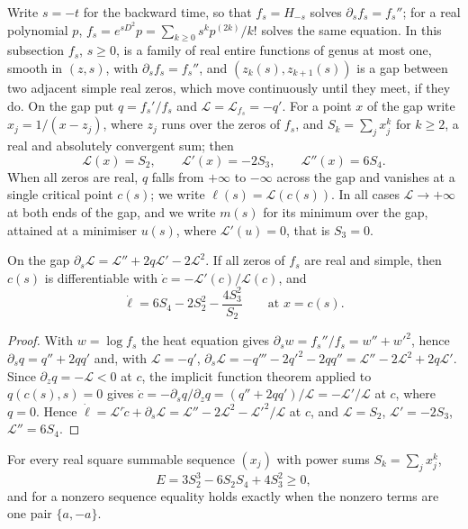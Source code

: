 Write $s=-t$ for the backward time, so that $f_s=H_{-s}$ solves $\partial_sf_s=f_s''$; for a real polynomial $p$, $f_s=e^{sD^2}p=\sum_{k\ge0}s^kp^{(2k)}/k!$ solves the same equation. In this subsection $f_s$, $s\ge0$, is a family of real entire functions of genus at most one, smooth in $(z,s)$, with $\partial_sf_s=f_s''$, and $(z_k(s),z_{k+1}(s))$ is a gap between two adjacent simple real zeros, which move continuously until they meet, if they do. On the gap put $q=f_s'/f_s$ and $\mathcal L=\mathcal L_{f_s}=-q'$. For a point $x$ of the gap write $x_j=1/(x-z_j)$, where $z_j$ runs over the zeros of $f_s$, and $S_k=\sum_jx_j^k$ for $k\ge2$, a real and absolutely convergent sum; then
\[
\mathcal L(x)=S_2,\qquad\mathcal L'(x)=-2S_3,\qquad\mathcal L''(x)=6S_4.
\]
When all zeros are real, $q$ falls from $+\infty$ to $-\infty$ across the gap and vanishes at a single critical point $c(s)$; we write $\ell(s)=\mathcal L(c(s))$. In all cases $\mathcal L\to+\infty$ at both ends of the gap, and we write $m(s)$ for its minimum over the gap, attained at a minimiser $u(s)$, where $\mathcal L'(u)=0$, that is $S_3=0$.

\begin{lemma}\label{lem:wigbiane:evol}
On the gap $\partial_s\mathcal L=\mathcal L''+2q\mathcal L'-2\mathcal L^2$. If all zeros of $f_s$ are real and simple, then $c(s)$ is differentiable with $\dot c=-\mathcal L'(c)/\mathcal L(c)$, and
\[
\dot\ell=6S_4-2S_2^2-\frac{4S_3^2}{S_2}\qquad\text{at }x=c(s).
\]
\end{lemma}

\begin{proof}
With $w=\log f_s$ the heat equation gives $\partial_sw=f_s''/f_s=w''+w'^2$, hence $\partial_sq=q''+2qq'$ and, with $\mathcal L=-q'$, $\partial_s\mathcal L=-q'''-2q'^2-2qq''=\mathcal L''-2\mathcal L^2+2q\mathcal L'$. Since $\partial_zq=-\mathcal L<0$ at $c$, the implicit function theorem applied to $q(c(s),s)=0$ gives $\dot c=-\partial_sq/\partial_zq=(q''+2qq')/\mathcal L=-\mathcal L'/\mathcal L$ at $c$, where $q=0$. Hence $\dot\ell=\mathcal L'\dot c+\partial_s\mathcal L=\mathcal L''-2\mathcal L^2-\mathcal L'^2/\mathcal L$ at $c$, and $\mathcal L=S_2$, $\mathcal L'=-2S_3$, $\mathcal L''=6S_4$.
\end{proof}

\begin{lemma}\label{lem:wigbiane:sextic}
For every real square summable sequence $(x_j)$ with power sums $S_k=\sum_jx_j^k$,
\[
E=3S_2^3-6S_2S_4+4S_3^2\ge0,
\]
and for a nonzero sequence equality holds exactly when the nonzero terms are one pair $\{a,-a\}$.
\end{lemma}

